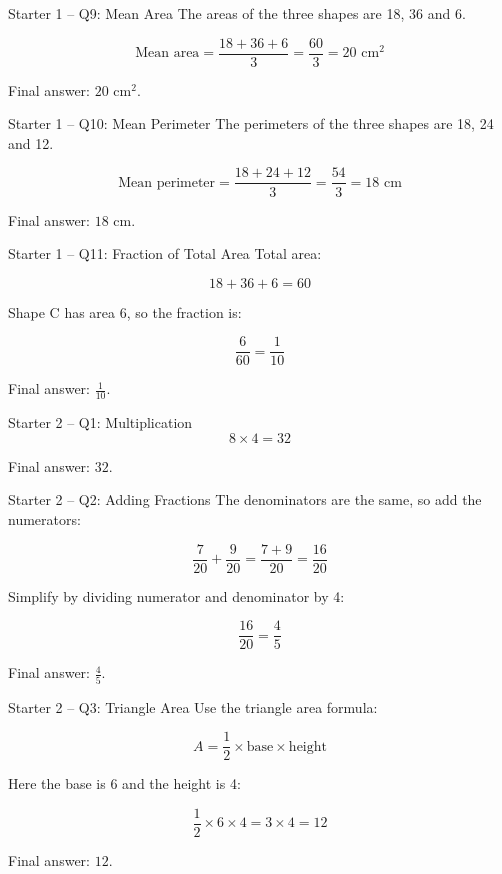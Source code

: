 \documentclass{beamer}
\begin{document}
\begin{frame}{Starter 1 -- Q9: Mean Area}
\small
The areas of the three shapes are 18, 36 and 6.

\[
\text{Mean area}=\frac{18+36+6}{3}=\frac{60}{3}=20\text{ cm}^2
\]

Final answer: \(\boxed{20\text{ cm}^2}\).
\end{frame}

\begin{frame}{Starter 1 -- Q10: Mean Perimeter}
\small
The perimeters of the three shapes are 18, 24 and 12.

\[
\text{Mean perimeter}=\frac{18+24+12}{3}=\frac{54}{3}=18\text{ cm}
\]

Final answer: \(\boxed{18\text{ cm}}\).
\end{frame}

\begin{frame}{Starter 1 -- Q11: Fraction of Total Area}
\small
Total area:

\[
18+36+6=60
\]

Shape C has area 6, so the fraction is:

\[
\frac{6}{60}=\frac{1}{10}
\]

Final answer: \(\boxed{\frac{1}{10}}\).
\end{frame}

\begin{frame}[label=starter2work]{Starter 2 -- Q1: Multiplication}
\small
\[
8 \times 4 = 32
\]

Final answer: \(\boxed{32}\).
\end{frame}

\begin{frame}{Starter 2 -- Q2: Adding Fractions}
\small
The denominators are the same, so add the numerators:

\[
\frac{7}{20}+\frac{9}{20}
=\frac{7+9}{20}
=\frac{16}{20}
\]

Simplify by dividing numerator and denominator by 4:

\[
\frac{16}{20}=\frac{4}{5}
\]

Final answer: \(\boxed{\frac{4}{5}}\).
\end{frame}

\begin{frame}{Starter 2 -- Q3: Triangle Area}
\small
Use the triangle area formula:

\[
A=\frac12 \times \text{base} \times \text{height}
\]

Here the base is 6 and the height is 4:

\[
\frac12 \times 6 \times 4 = 3 \times 4 = 12
\]

Final answer: \(\boxed{12}\).
\end{frame}
\end{document}

